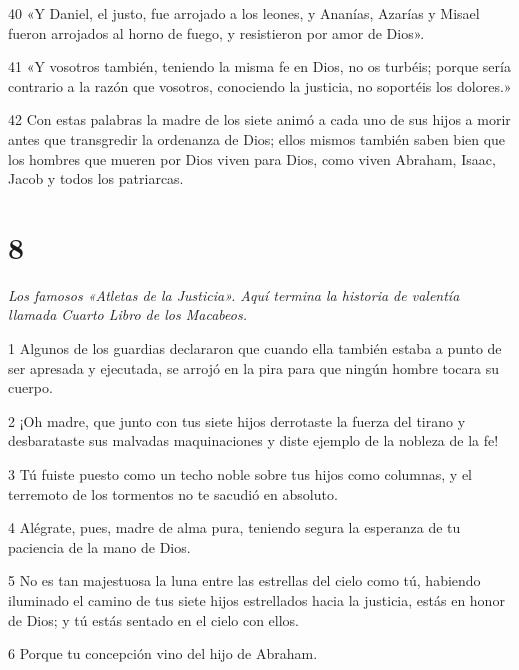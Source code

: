 \par 40 «Y Daniel, el justo, fue arrojado a los leones, y Ananías, Azarías y Misael fueron arrojados al horno de fuego, y resistieron por amor de Dios».

\par 41 «Y vosotros también, teniendo la misma fe en Dios, no os turbéis; porque sería contrario a la razón que vosotros, conociendo la justicia, no soportéis los dolores.»

\par 42 Con estas palabras la madre de los siete animó a cada uno de sus hijos a morir antes que transgredir la ordenanza de Dios; ellos mismos también saben bien que los hombres que mueren por Dios viven para Dios, como viven Abraham, Isaac, Jacob y todos los patriarcas.



\chapter{8}

\par \textit{Los famosos «Atletas de la Justicia». Aquí termina la historia de valentía llamada Cuarto Libro de los Macabeos.}

\par 1 Algunos de los guardias declararon que cuando ella también estaba a punto de ser apresada y ejecutada, se arrojó en la pira para que ningún hombre tocara su cuerpo.

\par 2 ¡Oh madre, que junto con tus siete hijos derrotaste la fuerza del tirano y desbarataste sus malvadas maquinaciones y diste ejemplo de la nobleza de la fe!

\par 3 Tú fuiste puesto como un techo noble sobre tus hijos como columnas, y el terremoto de los tormentos no te sacudió en absoluto.

\par 4 Alégrate, pues, madre de alma pura, teniendo segura la esperanza de tu paciencia de la mano de Dios.

\par 5 No es tan majestuosa la luna entre las estrellas del cielo como tú, habiendo iluminado el camino de tus siete hijos estrellados hacia la justicia, estás en honor de Dios; y tú estás sentado en el cielo con ellos.

\par 6 Porque tu concepción vino del hijo de Abraham.

